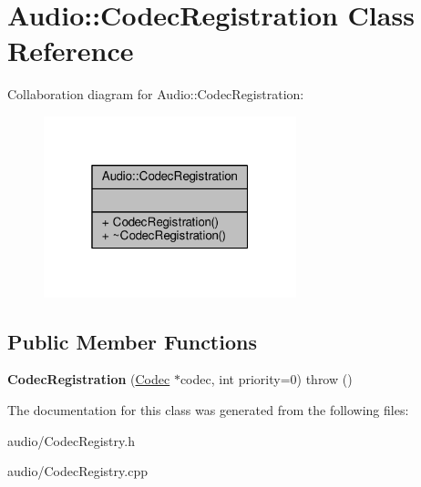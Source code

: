 \hypertarget{classAudio_1_1CodecRegistration}{}\section{Audio\+:\+:Codec\+Registration Class Reference}
\label{classAudio_1_1CodecRegistration}


Collaboration diagram for Audio\+:\+:Codec\+Registration\+:
\nopagebreak
\begin{figure}[H]
\begin{center}
\leavevmode
\includegraphics[width=208pt]{d8/d69/classAudio_1_1CodecRegistration__coll__graph}
\end{center}
\end{figure}
\subsection*{Public Member Functions}
\begin{DoxyCompactItemize}
\item 
{\bfseries Codec\+Registration} (\hyperlink{classAudio_1_1Codec}{Codec} $\ast$codec, int priority=0)  throw ()\hypertarget{classAudio_1_1CodecRegistration_aea154a5a2a8e350e7fd1db75fc30ad98}{}\label{classAudio_1_1CodecRegistration_aea154a5a2a8e350e7fd1db75fc30ad98}

\end{DoxyCompactItemize}


The documentation for this class was generated from the following files\+:\begin{DoxyCompactItemize}
\item 
audio/Codec\+Registry.\+h\item 
audio/Codec\+Registry.\+cpp\end{DoxyCompactItemize}
